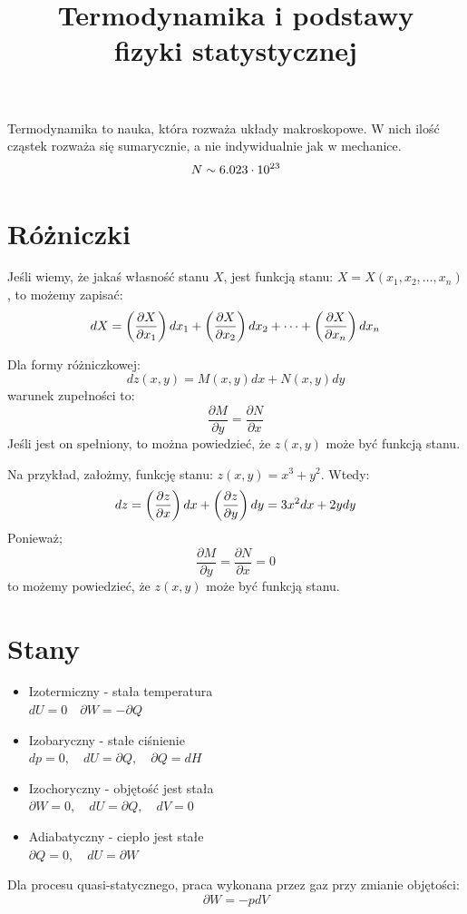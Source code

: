 \documentclass{../notatki}
\title{Termodynamika i podstawy \\ fizyki statystycznej}
\begin{document}
Termodynamika to nauka, która rozważa układy makroskopowe. W nich ilość cząstek
rozważa się sumarycznie, a nie indywidualnie jak w mechanice.
$$
N \sim 6.023 \cdot 10^{23} \\
$$

\section{Różniczki}

Jeśli wiemy, że jakaś własność stanu $X$, jest funkcją stanu: $X =
X(x_1, x_2, \dots, x_n)$,
to możemy zapisać:
$$
dX = \left(\frac{\partial X}{\partial x_1}\right) dx_1 +
\left(\frac{\partial X}{\partial x_2}\right) dx_2 + \dots +
\left(\frac{\partial X}{\partial x_n}\right) dx_n
$$

Dla formy różniczkowej:
$$
dz(x, y) = M(x, y)dx + N(x, y)dy
$$
warunek zupełności to:
$$
\frac{\partial M}{\partial y} = \frac{\partial N}{\partial x}
$$
Jeśli jest on spełniony, to można powiedzieć, że $z(x, y)$ może być
funkcją stanu.

\begin{examplebox}
  Na przykład, założmy, funkcję stanu: $z(x, y) = x^3 + y^2$. Wtedy:
  $$
  dz = \left(\frac{\partial z}{\partial x}\right) dx + \left(\frac{\partial z}{\partial y}\right) dy = 3x^2 dx + 2y dy
  $$
  Ponieważ;
  $$
  \frac{\partial M}{\partial y} = \frac{\partial N}{\partial x} = 0
  $$
  to możemy powiedzieć, że $z(x, y)$ może być funkcją stanu.
\end{examplebox}

\section{Stany}

\begin{itemize}
  \item Izotermiczny - stała temperatura \\
    $dU = 0 \quad \partial W = - \partial Q$
  \item Izobaryczny - stałe ciśnienie \\
    $dp = 0, \quad dU = \partial Q, \quad \partial Q = dH$
  \item Izochoryczny - objętość jest stała\\
    $\partial W = 0, \quad dU = \partial Q, \quad dV = 0$
  \item Adiabatyczny - ciepło jest stałe\\
    $\partial Q = 0, \quad dU = \partial W$
\end{itemize}

Dla procesu quasi-statycznego, praca wykonana przez gaz przy zmianie
objętości:
$$
\partial W = -pdV
$$
\end{document}
